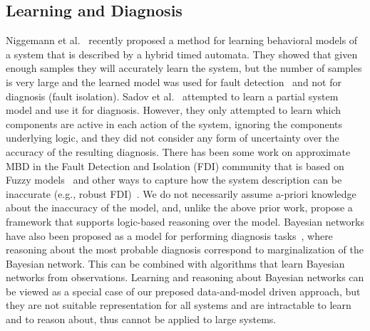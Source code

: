\documentclass[12pt]{article}
\newcommand{\note}[1]{\textbf{\textit{#1}}}
\begin{document}
\subsection{Learning and Diagnosis}
Niggemann et al.~\cite{niggemann2012learning} recently proposed a method for learning behavioral models of a system that is described by a hybrid timed automata. They showed that given enough samples they will accurately learn the system, but the number of samples is very large 
and the learned model was used for fault detection~\cite{niggemann2012learning} and not for diagnosis (fault isolation). Sadov et al.~\cite{sadov2010towards} attempted to learn a partial system model and use it for diagnosis. However, they only attempted to learn which components are active in each action of the system, ignoring the components underlying logic, and they did not consider any form of uncertainty over the  accuracy of the resulting diagnosis. 
There has been some work on approximate MBD in the Fault Detection and Isolation (FDI) community that is based on Fuzzy models~\cite{dexter1997model,mendoncca2003fault,castillo2005model,mendoncca2009architecture} and other ways to capture how the system description can be inaccurate (e.g., robust FDI)~\cite{chen2012robust,frank1997survey}. 
We do not necessarily assume a-priori knowledge about the inaccuracy of the model, and, unlike the above prior work, propose a framework that supports logic-based reasoning over the model.
Bayesian networks have also been proposed as a model for performing diagnosis tasks~\cite{darwiche2009modeling,el1995diagnosing}, where reasoning about the most probable diagnosis correspond to marginalization of the Bayesian network. This can be combined with algorithms that learn Bayesian networks from observations. Learning and reasoning about Bayesian networks can be viewed as a special case of our preposed data-and-model driven approach, but they are not suitable representation for all systems and are intractable  to learn and to reason about, thus cannot be applied to large systems. %
\end{document}
